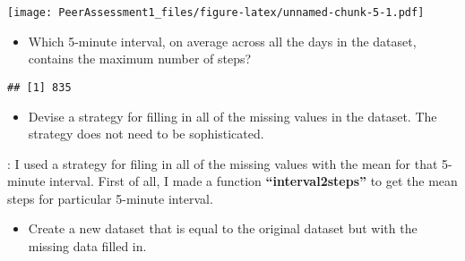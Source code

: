 \documentclass[]{article}
\newenvironment{Shaded}{\begin{snugshade}}{\end{snugshade}}
\newcommand{\KeywordTok}[1]{\textcolor[rgb]{0.13,0.29,0.53}{\textbf{#1}}}
\newcommand{\ControlFlowTok}[1]{\textcolor[rgb]{0.13,0.29,0.53}{\textbf{#1}}}
\newcommand{\OperatorTok}[1]{\textcolor[rgb]{0.81,0.36,0.00}{\textbf{#1}}}
\newcommand{\NormalTok}[1]{#1}
\providecommand{\tightlist}{%
  \setlength{\itemsep}{0pt}\setlength{\parskip}{0pt}}
\begin{document}
\texttt{[image: PeerAssessment1\_files/figure-latex/unnamed-chunk-5-1.pdf]}

\begin{itemize}
\tightlist
\item
  Which 5-minute interval, on average across all the days in the
  dataset, contains the maximum number of steps?
\end{itemize}

\begin{Shaded}
\end{Shaded}

\begin{verbatim}
## [1] 835
\end{verbatim}

\begin{itemize}
\tightlist
\item
  Devise a strategy for filling in all of the missing values in the
  dataset. The strategy does not need to be sophisticated.
\end{itemize}

: I used a strategy for filing in all of the missing values with the
mean for that 5-minute interval. First of all, I made a function
\textbf{``interval2steps''} to get the mean steps for particular
5-minute interval.

\begin{Shaded}
\end{Shaded}

\begin{itemize}
\tightlist
\item
  Create a new dataset that is equal to the original dataset but with
  the missing data filled in.
\end{itemize}
\end{document}
